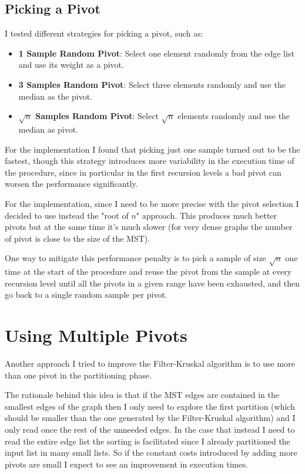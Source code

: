 \documentclass{article}
\begin{document}
\subsection{Picking a Pivot}

I tested different strategies for picking a pivot, such as:
\begin{itemize}
    \item \textbf{1 Sample Random Pivot}: Select one element randomly from the edge list and use its weight as a pivot.
    \item \textbf{3 Samples Random Pivot}: Select three elements randomly and use the median as the pivot.
    \item \textbf{$\sqrt n$ Samples Random Pivot}: Select $\sqrt n$ elements randomly and use the median as pivot.
\end{itemize}

For the  implementation I found that picking just one sample turned out to be the fastest, though this strategy introduces more variability in the execution time of the procedure, since in particular in the first recursion levels a bad pivot can worsen the performance significantly.

For the  implementation, since I need to be more precise with the pivot selection I decided to use instead the "root of $n$" approach. This produces much better pivots but at the same time it's much slower (for very dense graphs the number of pivot is close to the size of the MST). 

One way to mitigate this performance penalty is to pick a sample of size $\sqrt n$ one time at the start of the procedure and reuse the pivot from the sample at every recursion level until all the pivots in a given range have been exhausted, and then go back to a single random sample per pivot.

\section{Using Multiple Pivots}

Another approach I tried to improve the Filter-Kruskal algorithm is to use more than one pivot in the partitioning phase.

The rationale behind this idea is that if the MST edges are contained in the smallest edges of the graph then I only need to explore the first partition (which should be smaller than the one generated by the Filter-Kruskal algorithm) and I only read once the rest of the unneeded edges. In the case that instead I need to read the entire edge list the sorting is facilitated since I already partitioned the input list in many small lists. So if the constant costs introduced by adding more pivots are small I expect to see an improvement in execution times.
\end{document}
